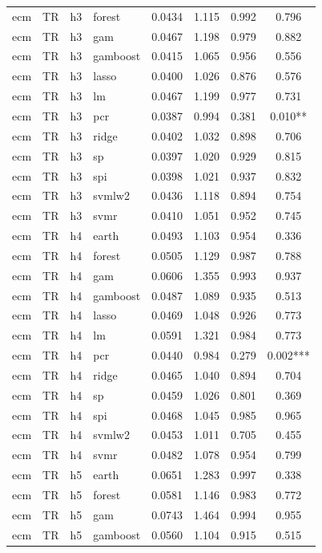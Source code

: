 \begin{ThreePartTable}
\begin{longtable}[t]{llclcccc}
ecm & TR & h3 & forest & 0.0434 & 1.115 & 0.992 & 0.796\\
ecm & TR & h3 & gam & 0.0467 & 1.198 & 0.979 & 0.882\\
ecm & TR & h3 & gamboost & 0.0415 & 1.065 & 0.956 & 0.556\\
ecm & TR & h3 & lasso & 0.0400 & 1.026 & 0.876 & 0.576\\
ecm & TR & h3 & lm & 0.0467 & 1.199 & 0.977 & 0.731\\
ecm & TR & h3 & pcr & 0.0387 & 0.994 & 0.381 & 0.010**\\
ecm & TR & h3 & ridge & 0.0402 & 1.032 & 0.898 & 0.706\\
ecm & TR & h3 & sp & 0.0397 & 1.020 & 0.929 & 0.815\\
ecm & TR & h3 & spi & 0.0398 & 1.021 & 0.937 & 0.832\\
ecm & TR & h3 & svmlw2 & 0.0436 & 1.118 & 0.894 & 0.754\\
ecm & TR & h3 & svmr & 0.0410 & 1.051 & 0.952 & 0.745\\
\addlinespace
ecm & TR & h4 & earth & 0.0493 & 1.103 & 0.954 & 0.336\\
ecm & TR & h4 & forest & 0.0505 & 1.129 & 0.987 & 0.788\\
ecm & TR & h4 & gam & 0.0606 & 1.355 & 0.993 & 0.937\\
ecm & TR & h4 & gamboost & 0.0487 & 1.089 & 0.935 & 0.513\\
ecm & TR & h4 & lasso & 0.0469 & 1.048 & 0.926 & 0.773\\
ecm & TR & h4 & lm & 0.0591 & 1.321 & 0.984 & 0.773\\
ecm & TR & h4 & pcr & 0.0440 & 0.984 & 0.279 & 0.002***\\
ecm & TR & h4 & ridge & 0.0465 & 1.040 & 0.894 & 0.704\\
ecm & TR & h4 & sp & 0.0459 & 1.026 & 0.801 & 0.369\\
ecm & TR & h4 & spi & 0.0468 & 1.045 & 0.985 & 0.965\\
ecm & TR & h4 & svmlw2 & 0.0453 & 1.011 & 0.705 & 0.455\\
ecm & TR & h4 & svmr & 0.0482 & 1.078 & 0.954 & 0.799\\
\addlinespace
ecm & TR & h5 & earth & 0.0651 & 1.283 & 0.997 & 0.338\\
ecm & TR & h5 & forest & 0.0581 & 1.146 & 0.983 & 0.772\\
ecm & TR & h5 & gam & 0.0743 & 1.464 & 0.994 & 0.955\\
ecm & TR & h5 & gamboost & 0.0560 & 1.104 & 0.915 & 0.515\\

\end{longtable}
\end{ThreePartTable}
